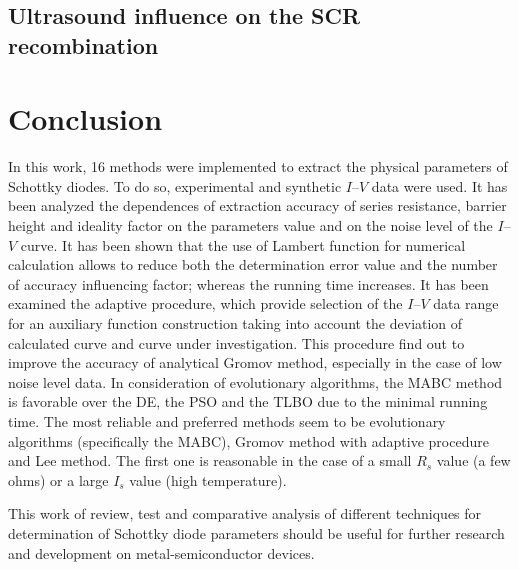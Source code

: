 \documentclass[aip,jap, amsmath,amssymb,reprint]{revtex4-1}
\begin{document}
\subsection{Ultrasound influence on the SCR recombination
\label{P1}}



\section{Conclusion}
In this work, 16 methods were implemented to extract the physical parameters of Schottky diodes.
To do so, experimental and synthetic $I$--$V$ data were used.
It has been analyzed the dependences of extraction accuracy of series resistance, barrier height and ideality factor on the parameters value and on the noise level of the $I$--$V$ curve.
It has been shown that the use of Lambert function for numerical calculation allows to reduce both the determination error value and the number of accuracy influencing factor; whereas the running time increases.
It has been examined the adaptive procedure, which provide selection of the $I$--$V$ data range for an auxiliary function construction taking into account the deviation of calculated curve and curve under investigation.
This procedure find out to improve the accuracy of analytical Gromov method, especially in the case of low noise level data.
In consideration of evolutionary algorithms, the MABC method is favorable over the DE, the PSO and the TLBO due to the minimal running time.
The most reliable and preferred methods seem to be evolutionary algorithms (specifically the MABC), Gromov method with adaptive procedure and Lee method.
The first one is reasonable in the case of
a small $R_s$ value (a few ohms) or a large $I_s$ value (high temperature).

This work of review, test and comparative analysis of different techniques for determination of Schottky diode parameters should be useful for further research and development on metal-semiconductor devices.


\end{document}
